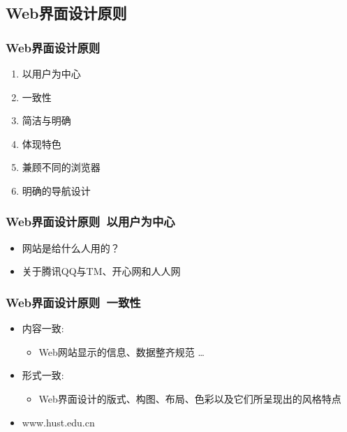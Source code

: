 \documentclass{beamer}
\begin{document}
\subsection{Web界面设计原则}
\begin{frame}
	\frametitle{Web界面设计原则}
	\beamertemplatetransparentcovereddynamicmedium
	\begin{enumerate}[<+->]
		\item 以用户为中心
		\item 一致性
		\item 简洁与明确
		\item 体现特色
		\item 兼顾不同的浏览器
		\item 明确的导航设计
	\end{enumerate}
\end{frame}

\begin{frame}
	\frametitle{Web界面设计原则~{\small 以用户为中心}}
	\beamertemplatetransparentcovereddynamicmedium
	\begin{itemize}[<+->]
		\item 网站是给什么人用的？
		\item 关于腾讯QQ与TM、开心网和人人网
	\end{itemize}
\end{frame}

\begin{frame}
	\frametitle{Web界面设计原则~{\small 一致性}}
	\beamertemplatetransparentcovereddynamicmedium
	\begin{itemize}
		\item 内容一致:
		\begin{itemize}
			\item Web网站显示的信息、数据整齐规范 \dots
		\end{itemize}
		\pause
		\item 形式一致:
		\begin{itemize}
			\item Web界面设计的版式、构图、布局、色彩以及它们所呈现出的风格特点
		\end{itemize}
		\pause
		\item www.hust.edu.cn
	\end{itemize}
\end{frame}
\end{document}
